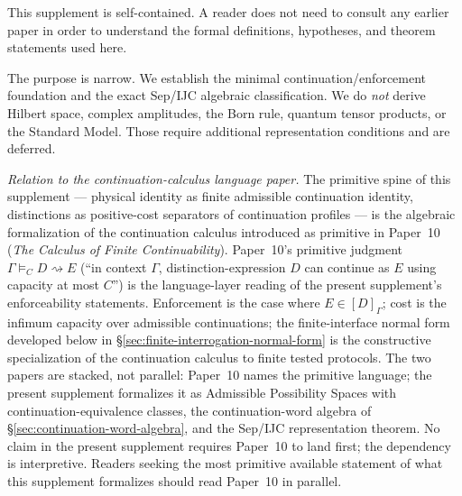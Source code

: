 \documentclass[11pt]{article}
\begin{document}
This supplement is self-contained. A reader does not need to consult any earlier paper in order to understand the formal definitions, hypotheses, and theorem statements used here.

The purpose is narrow. We establish the minimal continuation/enforcement foundation and the exact Sep/IJC algebraic classification. We do \emph{not} derive Hilbert space, complex amplitudes, the Born rule, quantum tensor products, or the Standard Model. Those require additional representation conditions and are deferred.

\medskip
\noindent\textit{Relation to the continuation-calculus language paper.}\quad
The primitive spine of this supplement --- physical identity as finite admissible continuation identity, distinctions as positive-cost separators of continuation profiles --- is the algebraic formalization of the continuation calculus introduced as primitive in Paper~10 (\emph{The Calculus of Finite Continuability}).  Paper~10's primitive judgment $\Gamma\vDash_C D\rightsquigarrow E$ (``in context $\Gamma$, distinction-expression $D$ can continue as $E$ using capacity at most $C$'') is the language-layer reading of the present supplement's enforceability statements.  Enforcement is the case where $E\in[D]_\Gamma$; cost is the infimum capacity over admissible continuations; the finite-interface normal form developed below in \S\ref{sec:finite-interrogation-normal-form} is the constructive specialization of the continuation calculus to finite tested protocols.  The two papers are stacked, not parallel: Paper~10 names the primitive language; the present supplement formalizes it as Admissible Possibility Spaces with continuation-equivalence classes, the continuation-word algebra of \S\ref{sec:continuation-word-algebra}, and the Sep/IJC representation theorem.  No claim in the present supplement requires Paper~10 to land first; the dependency is interpretive.  Readers seeking the most primitive available statement of what this supplement formalizes should read Paper~10 in parallel.
\end{document}
